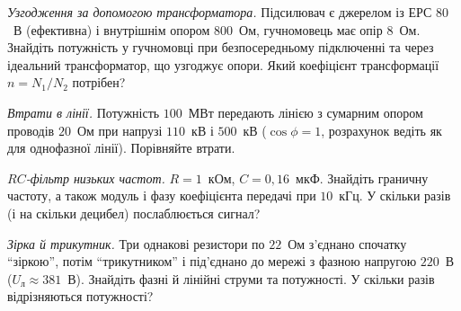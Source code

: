 \begin{problem}\label{prb:MatchingSpeaker}
	\emph{Узгодження за допомогою трансформатора.} Підсилювач є джерелом із ЕРС $80$~В (ефективна) і внутрішнім опором $800$~Ом, гучномовець має опір $8$~Ом. Знайдіть потужність у гучномовці при безпосередньому підключенні та через ідеальний трансформатор, що узгоджує опори. Який коефіцієнт трансформації $n=N_1/N_2$ потрібен?
\end{problem}

\begin{problem}\label{prb:TransmissionLoss}
	\emph{Втрати в лінії.} Потужність $100$~МВт передають лінією з сумарним опором проводів $20$~Ом при напрузі $110$~кВ і $500$~кВ ($\cos\phi=1$, розрахунок ведіть як для однофазної лінії). Порівняйте втрати.
\end{problem}

\begin{problem}\label{prb:RCFilter}
	\emph{$RC$-фільтр низьких частот.} $R=1$~кОм, $C=0{,}16$~мкФ. Знайдіть граничну частоту, а також модуль і фазу коефіцієнта передачі при $10$~кГц. У скільки разів (і на скільки децибел) послаблюється сигнал?
\end{problem}

\begin{problem}\label{prb:StarDelta}
	\emph{Зірка й трикутник.} Три однакові резистори по $22$~Ом з'єднано спочатку \enquote{зіркою}, потім \enquote{трикутником} і під'єднано до мережі з фазною напругою $220$~В ($U_\text{л}\approx381$~В). Знайдіть фазні й лінійні струми та потужності. У скільки разів відрізняються потужності?
\end{problem}

